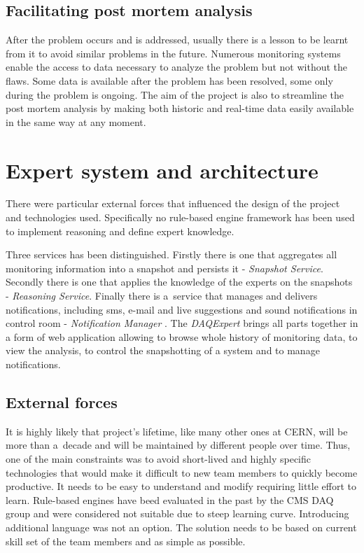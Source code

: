 \documentclass[a4paper]{jpconf}
\begin{document}
\subsection{Facilitating post mortem analysis}
After the problem occurs and is addressed, usually there is a lesson to be learnt from it to avoid similar problems in the future. Numerous monitoring systems enable the access to data necessary to analyze the problem but not without the flaws. Some data is available after the problem has been resolved, some only during the problem is ongoing. The aim of the project is also to streamline the post mortem analysis by making both historic and real-time data easily available in the same way at any moment.

\section{Expert system and architecture}
There were particular external forces that influenced the design of the project and technologies used. Specifically no rule-based engine framework has been used to implement reasoning and define expert knowledge.

Three services has been distinguished. Firstly there is one that aggregates all monitoring information into a snapshot and persists it - {\it Snapshot Service}. Secondly there is one that applies the knowledge of the experts on the snapshots - { \it Reasoning Service}. Finally there is a~service that manages and delivers notifications, including sms, e-mail and live suggestions and sound notifications in control room - { \it Notification Manager }. The { \it DAQExpert } brings all parts together in a form of web application allowing to browse whole history of monitoring data, to view the analysis, to control the snapshotting of a system and to manage notifications.

\subsection{External forces}
It is highly likely that project's lifetime, like many other ones at CERN, will be more than a~decade and will be maintained by different people over time. Thus, one of the main constraints was to avoid short-lived and highly specific technologies that would make it difficult to new team members to quickly become productive. It needs to be easy to understand and modify requiring little effort to learn. Rule-based engines have beed evaluated in the past by the CMS DAQ group and were considered not suitable due to steep learning curve. Introducing additional language was not an option. The solution needs to be based on current skill set of the team members and as simple as possible.
\end{document}
